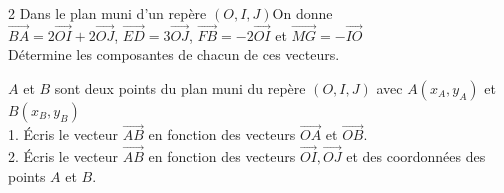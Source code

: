 \begin{multicols*}{2}
  	Dans le plan muni d'un repère $(O, I, J)$On donne
  	\\
  	$ \overrightarrow{BA} = 2\overrightarrow{OI} + 2\overrightarrow{OJ}$,  $  \overrightarrow{ED} = 3\overrightarrow{OJ} $,  $
  	\overrightarrow{FB} = -2\overrightarrow{OI} $ et $ \overrightarrow{MG} = -\overrightarrow{IO}
  	$
  	\\ Détermine les composantes de chacun de ces vecteurs.
  	\dure 
  	\resul 
  	
  	
  	$A$ et $B$ sont deux points du plan muni du repère $(O, I, J)$ avec $A(x_A, y_A)$ et $B(x_B, y_B)$ \\
  	1. Écris le vecteur $\overrightarrow{AB}$ en fonction des vecteurs $\overrightarrow{OA}$ et $\overrightarrow{OB}$. \\
  	2. Écris le vecteur $\overrightarrow{AB}$ en fonction des vecteurs $\overrightarrow{OI}, \overrightarrow{OJ}$ et des coordonnées des points $A$ et $B$.
  	

\end{multicols*}
